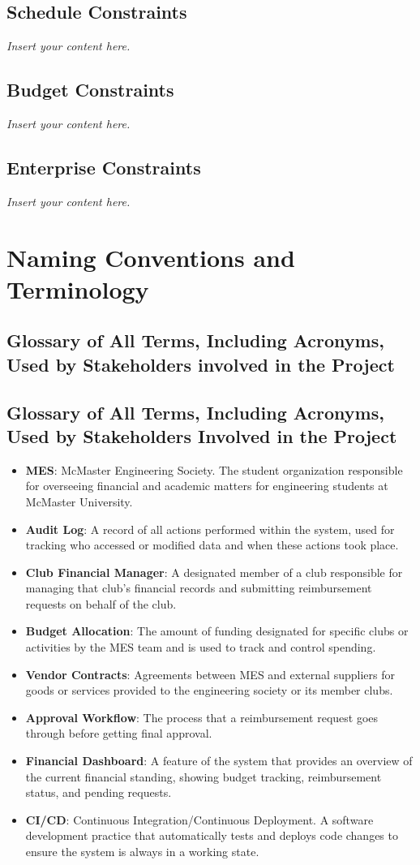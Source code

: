 \documentclass[12pt]{article}
\newcommand{\lips}{\textit{Insert your content here.}}
\begin{document}
\subsection{Schedule Constraints}
\lips
\subsection{Budget Constraints}
\lips
\subsection{Enterprise Constraints}
\lips

\section{Naming Conventions and Terminology}
\subsection{Glossary of All Terms, Including Acronyms, Used by Stakeholders
involved in the Project}

\subsection{Glossary of All Terms, Including Acronyms, Used by Stakeholders Involved in the Project}

\begin{itemize}
    \item \textbf{MES}: McMaster Engineering Society. The student organization responsible for overseeing financial and academic matters for engineering students at McMaster University.    
    \item \textbf{Audit Log}: A record of all actions performed within the system, used for tracking who accessed or modified data and when these actions took place.
    \item \textbf{Club Financial Manager}: A designated member of a club responsible for managing that club's financial records and submitting reimbursement requests on behalf of the club.
    \item \textbf{Budget Allocation}: The amount of funding designated for specific clubs or activities by the MES team and is used to track and control spending.
    \item \textbf{Vendor Contracts}: Agreements between MES and external suppliers for goods or services provided to the engineering society or its member clubs.
    \item \textbf{Approval Workflow}: The process that a reimbursement request goes through before getting final approval.
    \item \textbf{Financial Dashboard}: A feature of the system that provides an overview of the current financial standing, showing budget tracking, reimbursement status, and pending requests.
    \item \textbf{CI/CD}: Continuous Integration/Continuous Deployment. A software development practice that automatically tests and deploys code changes to ensure the system is always in a working state.
\end{itemize}
\end{document}
